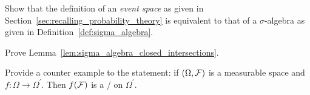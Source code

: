 \begin{problem}\label{prb:event_space_are_sigma_algebras}
Show that the definition of an \emph{event space} as given in Section~\ref{sec:recalling_probability_theory} is equivalent to that of a $\sigma$-algebra as given in Definition~\ref{def:sigma_algebra}.
\end{problem}

\begin{problem}\label{prb:sigma_algebra_closed_intersections}
Prove Lemma~\ref{lem:sigma_algebra_closed_intersections}.
\end{problem}

\begin{problem}\label{prb:converse_preimage_sigma_algebra}
Provide a counter example to the statement: if $(\Omega, \mathcal F)$ is a measurable space and $f : \Omega \to \Omega^\prime$. Then $f(\mathcal F)$ is a \sigalg/ on $\Omega^\prime$.
\end{problem}


